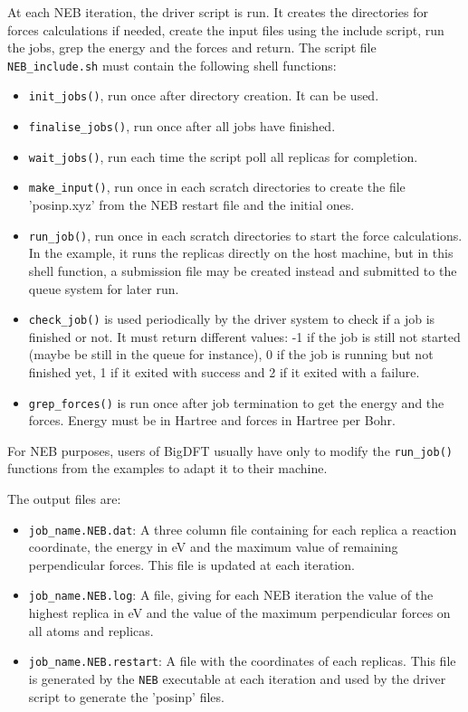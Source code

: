 \documentclass[a4paper,11pt]{report}
\begin{document}
At each NEB iteration, the driver script is run. It creates the directories for forces calculations if needed, create the input files using the include script, run the jobs, grep the energy and the forces and return. The script file \texttt{NEB\_include.sh} must contain the following shell functions:
\begin{itemize}
  \item \texttt{init\_jobs()}, run once after directory creation. It can be used.
  \item \texttt{finalise\_jobs()}, run once after all jobs have finished.
  \item \texttt{wait\_jobs()}, run each time the script poll all replicas for completion.
  \item \texttt{make\_input()}, run once in each scratch directories to create the file 'posinp.xyz' from the NEB restart file and the initial ones.
  \item \texttt{run\_job()}, run once in each scratch directories to start the force calculations. In the example, it runs the replicas directly on the host machine, but in this shell function, a submission file may be created instead and submitted to the queue system for later run.
  \item \texttt{check\_job()} is used periodically by the driver system to check if a job is finished or not. It must return different values: -1 if the job is still not started (maybe be still in the queue for instance), 0 if the job is running but not finished yet, 1 if it exited with success and 2 if it exited with a failure.
  \item \texttt{grep\_forces()} is run once after job termination to get the energy and the forces. Energy must be in Hartree and forces in Hartree per Bohr.
  \end{itemize}
For NEB purposes, users of BigDFT usually have only to modify the \texttt{run\_job()} functions from the examples to adapt it to their machine.

The output files are:
\begin{itemize}
  \item \texttt{job\_name.NEB.dat}: A three column file containing for each replica a reaction coordinate, the energy in eV and the maximum value of remaining perpendicular forces. This file is updated at each iteration.
  \item \texttt{job\_name.NEB.log}: A file, giving for each NEB iteration the value of the highest replica in eV and the value of the maximum perpendicular forces on all atoms and replicas.
  \item \texttt{job\_name.NEB.restart}: A file with the coordinates of each replicas. This file is generated by the \texttt{NEB} executable at each iteration and used by the driver script to generate the 'posinp' files.
\end{itemize}
\end{document}
